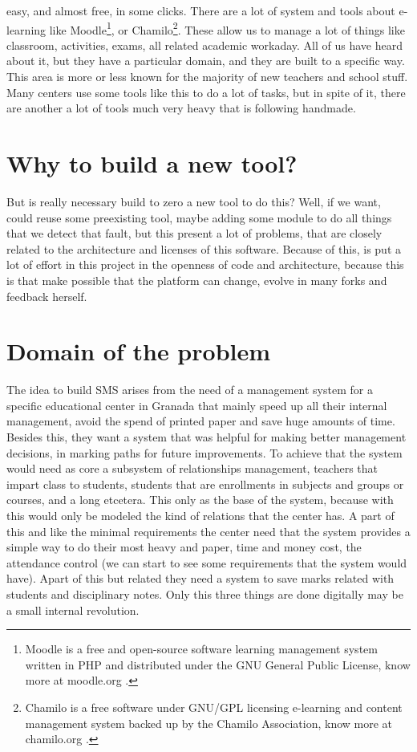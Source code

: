 easy, and almost free, in some clicks. There are a lot of system and
tools about e-learning like Moodle\footnote{Moodle is a free and open-source
software learning management system written in PHP and distributed under the GNU
General Public License, know more at moodle.org .},
 or Chamilo\footnote{Chamilo is a free software
under GNU/GPL licensing e-learning and content management system backed up by
the Chamilo Association, know more at chamilo.org .}.
These allow us to manage
a lot of things like classroom, activities, exams, all related academic workaday.
All of us have heard about it, but they have a particular domain, and they are built to a specific way.
\intro
This area is more or less known for the majority of new teachers
and school stuff. Many centers use some tools like this to do a lot
of tasks, but in spite of it, there are another a lot of tools much
very heavy that is following handmade.

\section{Why to build a new tool?}

But is really necessary build to zero a new tool to do this?  Well,
if we want, could reuse some preexisting tool, maybe adding some module
to do all things that we detect that fault, but this present a lot
of problems, that are closely related to the architecture and licenses
of this software.
\intro
Because of this, is put a lot of effort in this
project in the openness of code and architecture, because this is that
make possible that the platform can  change, evolve in many
forks and feedback herself.

\section{Domain of the problem}

The idea to build SMS arises from the need of a management system for
a specific educational center in Granada that mainly speed up all
their internal management, avoid the spend of printed paper and save
huge amounts of time.
\intro
Besides this, they want a system that was helpful
for making better management decisions, in marking paths for future
improvements. To achieve that the system would need as core
a subsystem of relationships management, teachers that impart class
to students, students that are enrollments in subjects and groups
or courses, and a long etcetera. This only as the base of the system,
because with this would only be modeled the kind of relations that
the center has.
\intro
A part of this and like the minimal requirements
the center need that the system provides a simple way to do their most
heavy and paper, time and money cost, the attendance control (we can start to see
some requirements that the system would have). Apart of this but related they need
a system to save marks related with students and disciplinary notes. Only this three
things are done digitally may be a small internal revolution.

